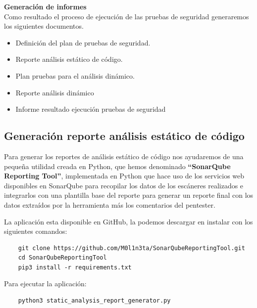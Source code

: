 \textbf{Generación de informes}\\
Como resultado el proceso de ejecución de las pruebas de seguridad generaremos los siguientes documentos.

\begin{itemize}
    \item Definición del plan de pruebas de seguridad.
    \item Reporte análisis estático de código.
    \item Plan pruebas para el análisis dinámico.
    \item Reporte análisis dinámico
    \item Informe resultado ejecución pruebas de seguridad
\end{itemize}

\subsection{Generación reporte análisis estático de código}

Para generar los reportes de análisis estático de código nos ayudaremos de una pequeña utilidad creada en Python, que hemos 
denominado \textbf{“SonarQube Reporting Tool”}, implementada en Python que hace uso de los servicios web disponibles en SonarQube
para recopilar los datos de los escáneres realizados e integrarlos con una plantilla base del 
reporte para generar un reporte final con los datos extraídos por la herramienta más los comentarios del pentester.

La aplicación esta disponible en GitHub, la podemos descargar en instalar con los siguientes comandos:
\begin{verbatim}
    git clone https://github.com/M0l1n3ta/SonarQubeReportingTool.git
    cd SonarQubeReportingTool
    pip3 install -r requirements.txt
\end{verbatim}

Para ejecutar la aplicación:
\begin{verbatim}
    python3 static_analysis_report_generator.py
\end{verbatim}

